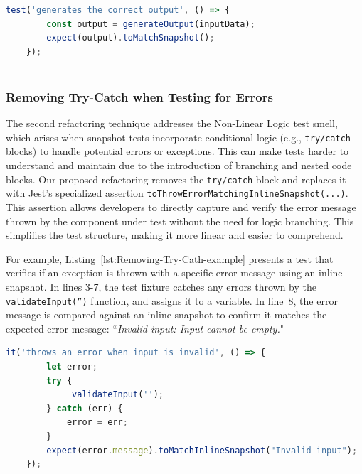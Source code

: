 \documentclass[
	msc, %
	english %
]{../ppgccufmg}
\begin{document}
        \begin{lstlisting}[language=javascript, caption=  Snapshot test after moving snapshot to an external file, label=lst:Move-Snapshot-to-an-External-File-2-example]
    test('generates the correct output', () => {
        const output = generateOutput(inputData);
        expect(output).toMatchSnapshot();
    });
                
        \end{lstlisting}       
        
        \subsubsection{Removing Try-Catch when Testing for Errors}
        
         The second refactoring technique addresses the Non-Linear Logic test smell, which arises when snapshot tests incorporate conditional logic (e.g., \texttt{try/catch} blocks) to handle potential errors or exceptions. This can make tests harder to understand and maintain due to the introduction of branching and nested code blocks. Our proposed refactoring removes the \texttt{try/catch} block and replaces it with Jest's specialized assertion \texttt{toThrowErrorMatchingInlineSnapshot(...)}. This assertion allows developers to directly capture and verify the error message thrown by the component under test without the need for logic branching. This simplifies the test structure, making it more linear and easier to comprehend. 
        
        For example, Listing~\ref{lst:Removing-Try-Cath-example} presents a test that verifies if an exception is thrown with a specific error message using an inline snapshot. In lines 3-7, the test fixture catches any errors thrown by the \texttt{validateInput('')} function, and assigns it to a variable. In line~8, the error message is compared against an inline snapshot to confirm it matches the expected error message: ``\textit{Invalid input: Input cannot be empty.}"
        
        \begin{lstlisting}[language=javascript, caption=  Snapshot test with non-linear logic, label=lst:Removing-Try-Cath-example]
    it('throws an error when input is invalid', () => {
        let error;
        try {
             validateInput('');
        } catch (err) {
            error = err;
        }
        expect(error.message).toMatchInlineSnapshot("Invalid input");
    });         
        \end{lstlisting}
        
\end{document}
